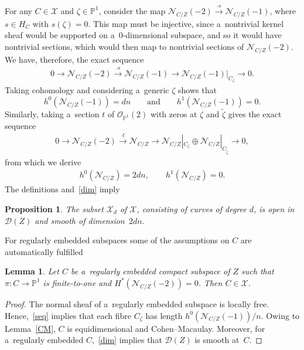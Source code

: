 \documentclass[11pt]{article}
\numberwithin{equation}{section}
\newtheorem{Lemma}[Theorem]{Lemma}
\newtheorem{Proposition}[Theorem]{Proposition}
{\theoremstyle{definition}
\newtheorem{Definition}[Theorem]{Definition}
\newtheorem{Remark}[Theorem]{Remark}
}
\begin{document}
For any $C\in {\mathcal{X}}$ and $\zeta\in {\mathbb{P}}^1$, consider the map ${\mathcal{N}}_{C/Z}(-2)\stackrel{\cdot
s}{\longrightarrow} {\mathcal{N}}_{C/Z}(-1)$, where $s\in H_C$ with $s(\zeta)=0$.
This map must be injective, since a~nontrivial kernel sheaf would be supported on a~$0$-dimensional subspace, and so it
would have nontrivial sections, which would then map to nontrivial sections of ${\mathcal{N}}_{C/Z}(-2)$.
We have, therefore, the exact sequence
\begin{gather}
0\to {\mathcal{N}}_{C/Z}(-2)\stackrel{\cdot s}{\longrightarrow} {\mathcal{N}}_{C/Z}(-1)\longrightarrow
{\mathcal{N}}_{C/Z}(-1)|_{C_\zeta}\to 0.
\label{seq}
\end{gather}
Taking cohomology and considering a~generic $\zeta$ shows that
\[
h^0( {\mathcal{N}}_{C/Z}(-1))=dn \qquad \text{and}\qquad h^1(
{\mathcal{N}}_{C/Z}(-1))=0.
\]
Similarly, taking a~section $t$ of ${\mathcal{O}}_{{\mathbb{P}}^1}(2)$ with zeros at $\zeta$ and $\tilde\zeta$ gives the
exact sequence
\begin{gather}
0\to {\mathcal{N}}_{C/Z}(-2)\stackrel{\cdot t}{\longrightarrow} {\mathcal{N}}_{C/Z}\longrightarrow
{\mathcal{N}}_{C/Z}|_{C_\zeta}\oplus {\mathcal{N}}_{C/Z}|_{C_{\tilde\zeta}}\to 0,
\label{seqq}
\end{gather}
from which we derive
\begin{gather}
h^0( {\mathcal{N}}_{C/Z})=2dn,
\qquad
h^1( {\mathcal{N}}_{C/Z})=0.
\label{dim}
\end{gather}
The def\/initions and~\eqref{dim} imply
\begin{Proposition}
The subset ${\mathcal{X}}_d$ of ${\mathcal{X}}$, consisting of curves of degree $d$, is open in ${\mathcal{D}}(Z)$ and
smooth of dimension~$2dn$.
\end{Proposition}

For regularly embedded subspaces some of the assumptions on $C$ are automatically fulf\/illed

\begin{Lemma}\label{ooo}
Let $C$ be a~regularly embedded compact subspace of $Z$ such that $\pi:C\to {\mathbb{P}}^1$ is finite-to-one and
$H^\ast({\mathcal{N}}_{C/Z}(-2))=0$.
Then $C\in {\mathcal{X}}$.
\end{Lemma}

\begin{proof}
The normal sheaf of a~regularly embedded subspace is locally free.
Hence,~\eqref{seq} implies that each f\/ibre $C_\zeta$ has length $h^0( {\mathcal{N}}_{C/Z}(-1))/n$.
Owing to Lemma~\ref{CM}, $C$ is equidimensional and Cohen--Macaulay.
Moreover, for a~regularly embedded $C$,~\eqref{dim} implies that ${\mathcal{D}}(Z)$ is smooth at~$C$.
\end{proof}
\end{document}
